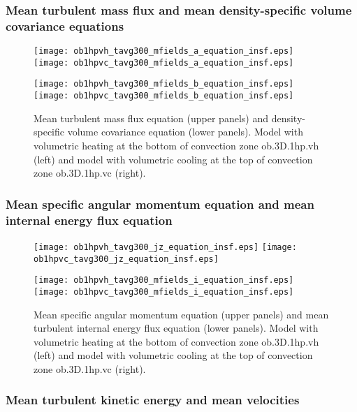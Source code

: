 \documentclass[10pt,paper=a4]{report}
\begin{document}
\newpage

\subsubsection{Mean turbulent mass flux and mean density-specific volume covariance equations}

\begin{figure}[!h]
\centerline{
\texttt{[image: ob1hpvh\_tavg300\_mfields\_a\_equation\_insf.eps]}
\texttt{[image: ob1hpvc\_tavg300\_mfields\_a\_equation\_insf.eps]}}

\centerline{
\texttt{[image: ob1hpvh\_tavg300\_mfields\_b\_equation\_insf.eps]}
\texttt{[image: ob1hpvc\_tavg300\_mfields\_b\_equation\_insf.eps]}}
\caption{Mean turbulent mass flux equation (upper panels) and density-specific volume covariance equation (lower panels). Model with volumetric heating at the bottom of convection zone {\sf ob.3D.1hp.vh} (left) and model with volumetric cooling at the top of convection zone {\sf ob.3D.1hp.vc} (right).}
\end{figure}

\newpage

\subsubsection{Mean specific angular momentum equation and mean internal energy flux equation}

\begin{figure}[!h]
\centerline{
\texttt{[image: ob1hpvh\_tavg300\_jz\_equation\_insf.eps]}
\texttt{[image: ob1hpvc\_tavg300\_jz\_equation\_insf.eps]}}

\centerline{
\texttt{[image: ob1hpvh\_tavg300\_mfields\_i\_equation\_insf.eps]}
\texttt{[image: ob1hpvc\_tavg300\_mfields\_i\_equation\_insf.eps]}}
\caption{Mean specific angular momentum equation (upper panels) and mean turbulent internal energy flux equation (lower panels). Model with volumetric heating at the bottom of convection zone {\sf ob.3D.1hp.vh} (left) and model with volumetric cooling at the top of convection zone {\sf ob.3D.1hp.vc} (right).}
\end{figure}

\newpage

\subsubsection{Mean turbulent kinetic energy and mean velocities}
\end{document}
